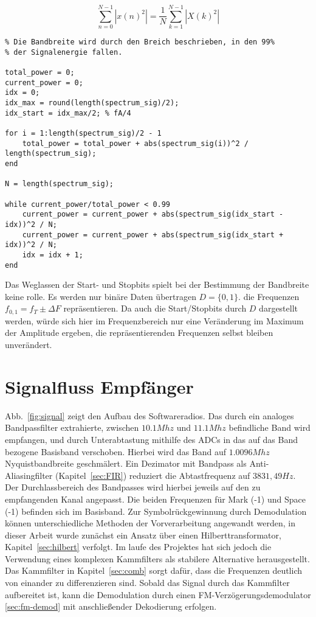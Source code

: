 \documentclass{article}
\begin{document}
$$
\sum_{n = 0}^{N - 1}\left\lvert x(n)^2\right\rvert =  \frac{1}{N} \sum_{k = 1}^{N-1}  \left\lvert X(k)^2\right\rvert 
$$
\begin{listing}
\begin{verbatim}
% Die Bandbreite wird durch den Breich beschrieben, in den 99%
% der Signalenergie fallen.

total_power = 0;
current_power = 0;
idx = 0;
idx_max = round(length(spectrum_sig)/2);
idx_start = idx_max/2; % fA/4

for i = 1:length(spectrum_sig)/2 - 1
    total_power = total_power + abs(spectrum_sig(i))^2 / length(spectrum_sig);
end

N = length(spectrum_sig);

while current_power/total_power < 0.99
    current_power = current_power + abs(spectrum_sig(idx_start - idx))^2 / N;
    current_power = current_power + abs(spectrum_sig(idx_start + idx))^2 / N;
    idx = idx + 1;
end
\end{verbatim}
\end{listing}

Das Weglassen der Start- und Stopbits spielt bei der Bestimmung der Bandbreite keine rolle.
Es werden nur binäre Daten übertragen $D = \{0, 1\}$. die Frequenzen $ f_{0, 1} = f_T \pm \varDelta F $ repräsentieren. 
Da auch die Start/Stopbits durch $D$ dargestellt werden, würde sich hier im Frequenzbereich
nur eine Veränderung im Maximum der Amplitude ergeben, die repräsentierenden Frequenzen selbst bleiben unverändert.



\section{Signalfluss Empfänger}

Abb.~\ref{fig:signal} zeigt den Aufbau des Softwareradios. Das durch ein analoges Bandpassfilter extrahierte, zwischen $10.1Mhz$ und $11.1Mhz$ befindliche Band wird empfangen, und durch Unterabtastung mithilfe des ADCs in das auf das Band bezogene Basisband verschoben.
Hierbei wird das Band auf $1.0096Mhz$ Nyquistbandbreite geschmälert. Ein Dezimator mit Bandpass als Anti-Aliasingfilter (Kapitel~\ref{sec:FIR}) reduziert die Abtastfrequenz auf $3831,49Hz$. Der Durchlassbereich des Bandpasses wird hierbei jeweils auf den zu empfangenden Kanal angepasst. Die beiden Frequenzen für Mark (-1) und Space (-1) befinden sich im Basisband. Zur Symbolrückgewinnung durch Demodulation können unterschiedliche Methoden der Vorverarbeitung angewandt werden, in dieser Arbeit wurde zunächst ein Ansatz über einen Hilberttransformator, Kapitel~\ref{sec:hilbert} verfolgt. Im laufe des Projektes hat sich jedoch die Verwendung eines komplexen Kammfilters
als stabilere Alternative herausgestellt. Das Kammfilter in Kapitel~\ref{sec:comb} sorgt dafür, dass die Frequenzen deutlich von einander zu differenzieren sind. Sobald das Signal durch das Kammfilter
aufbereitet ist, kann die Demodulation durch einen FM-Verzögerungsdemodulator \ref{sec:fm-demod} mit anschließender Dekodierung erfolgen.
\end{document}
